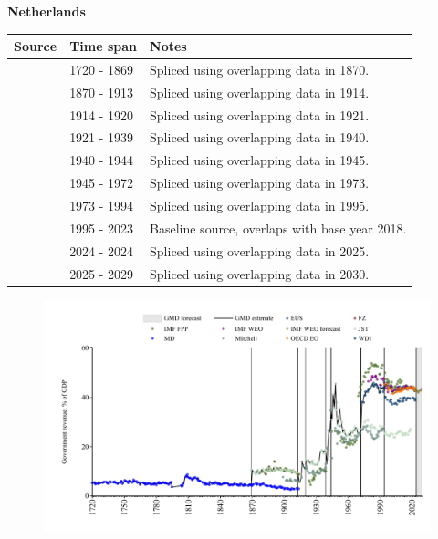 \documentclass[12pt,a4paper,landscape]{article}
\begin{document}
\begin{adjustbox}{max totalsize={\paperwidth}{\paperheight},center}
\begin{minipage}[t][\textheight][t]{\textwidth}
\vspace*{0.5cm}
{}
\begin{center}
{\Large\bfseries Netherlands}
\end{center}
\vspace{0.5cm}
\begin{table}[H]
\centering
\small
\begin{tabular}{|l|l|l|}
\hline
\textbf{Source} & \textbf{Time span} & \textbf{Notes} \\
\hline
\rowcolor{white}\cite{MD}& 1720 - 1869 &Spliced using overlapping data in 1870.\\
\rowcolor{lightgray}\cite{JST}& 1870 - 1913 &Spliced using overlapping data in 1914.\\
\rowcolor{white}\cite{Mitchell}& 1914 - 1920 &Spliced using overlapping data in 1921.\\
\rowcolor{lightgray}\cite{JST}& 1921 - 1939 &Spliced using overlapping data in 1940.\\
\rowcolor{white}\cite{Mitchell}& 1940 - 1944 &Spliced using overlapping data in 1945.\\
\rowcolor{lightgray}\cite{JST}& 1945 - 1972 &Spliced using overlapping data in 1973.\\
\rowcolor{white}\cite{WDI}& 1973 - 1994 &Spliced using overlapping data in 1995.\\
\rowcolor{lightgray}\cite{OECD_EO}& 1995 - 2023 &Baseline source, overlaps with base year 2018.\\
\rowcolor{white}\cite{EUS}& 2024 - 2024 &Spliced using overlapping data in 2025.\\
\rowcolor{lightgray}\cite{IMF_WEO_forecast}& 2025 - 2029 &Spliced using overlapping data in 2030.\\
\hline
\end{tabular}
\end{table}
\begin{figure}[H]
\centering
\includegraphics[width=\textwidth,height=0.6\textheight,keepaspectratio]{graphs/NLD_govrev_GDP.pdf}
\end{figure}
\end{minipage}
\end{adjustbox}
\end{document}
